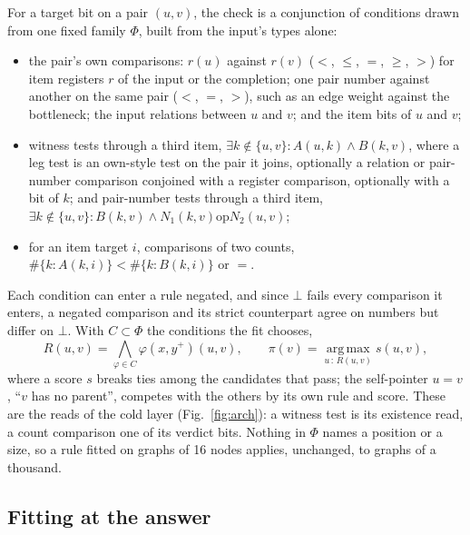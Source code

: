 \documentclass[10pt]{article}
\newcommand{\notyet}{\bot}
\begin{document}
For a target bit on a pair $(u,v)$, the check is a conjunction of conditions drawn from one fixed family $\Phi$, built
from the input's types alone:
\begin{itemize}
\setlength{\itemsep}{0pt}
\item the pair's own comparisons: $r(u)$ against $r(v)$ ($<$, $\leq$, $=$, $\geq$, $>$) for item registers $r$ of the input
or the completion; one pair number against another on the same pair ($<$, $=$, $>$), such as an edge weight against the
bottleneck; the input relations between $u$ and $v$; and the item bits of $u$ and $v$;
\item witness tests through a third item, $\exists k \notin \{u,v\} : A(u,k) \wedge B(k,v)$, where a leg test is an
own-style test on the pair it joins, optionally a relation or pair-number comparison conjoined with a register
comparison, optionally with a bit of $k$; and pair-number tests through a third item, $\exists k \notin \{u,v\} :
B(k,v) \wedge N_1(k,v) \mathbin{\mathrm{op}} N_2(u,v)$;
\item for an item target $i$, comparisons of two counts, $\#\{k : A(k,i)\} < \#\{k : B(k,i)\}$ or $=$.
\end{itemize}
Each condition can enter a rule negated, and since $\notyet$ fails every comparison it enters, a negated comparison and
its strict counterpart agree on numbers but differ on $\notyet$. With $C \subset \Phi$ the conditions the fit chooses,
\begin{equation}
R(u,v) = \bigwedge_{\varphi \in C} \varphi(x, y^{+})(u,v), \qquad
\pi(v) = \operatorname*{arg\,max}_{u \,:\, R(u,v)} s(u,v),
\label{eq:check}
\end{equation}
where a score $s$ breaks ties among the candidates that pass; the self-pointer $u = v$, ``$v$ has no parent'', competes
with the others by its own rule and score. These are the reads of the cold layer (Fig.~\ref{fig:arch}): a witness test is
its existence read, a count comparison one of its verdict bits\cite{mohsenvand2026zero}. Nothing in $\Phi$ names a
position or a size, so a rule fitted on graphs of 16 nodes applies, unchanged, to graphs of a thousand.

\subsection{Fitting at the answer}
\end{document}
